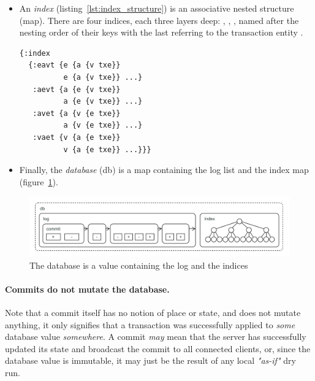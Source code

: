\begin{itemize}
\cleardoublepage
\item An \emph{index} (listing~\ref{lst:index_structure}) is an associative nested structure (map). There are four indices, each three layers deep: , , , named after the nesting order of their keys with the last  referring to the transaction entity .

\begin{lstlisting}[label={lst:index_structure},morekeywords={:+,:-,txe},caption=Structure of the indices]
{:index
  {:eavt {e {a {v txe}}
          e {a {v txe}} ...}
   :aevt {a {e {v txe}}
          a {e {v txe}} ...}
   :avet {a {v {e txe}}
          a {v {e txe}} ...}
   :vaet {v {a {e txe}}
          v {a {e txe}} ...}}}
\end{lstlisting}

\item Finally, the \emph{database} (db) is a map containing the log list and the index map (figure~\ref{fig:dbvalue}).

\begin{center}
\end{center}

\end{itemize}




\begin{figure}[!ht]
  \includegraphics[width=\linewidth]{images/dbvalue.pdf}
  \caption{The database is a value containing the log and the indices}
  \label{fig:dbvalue}
\end{figure}



\paragraph{Commits do not mutate the database.}
Note that a commit itself has no notion of place or state, and does not mutate anything, it only signifies that a transaction was successfully applied to \emph{some} database value \emph{somewhere}. A commit \emph{may} mean that the server has successfully updated its state and broadcast the commit to all connected clients, or, since the database value is immutable, it may just be the result of any local \emph{"as-if"} dry run.

